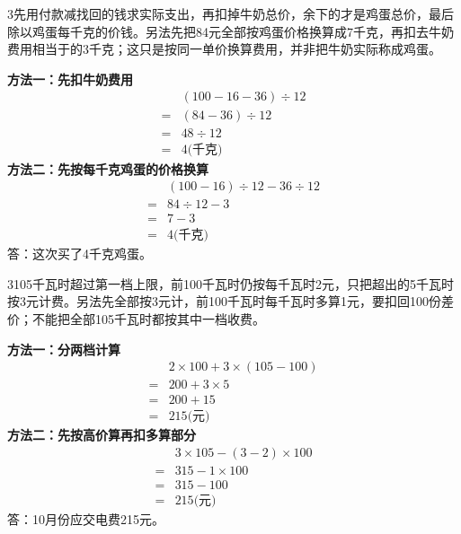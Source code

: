 \documentclass[multi=snippet,border={5bp 20bp 5bp 5bp}]{standalone}
\newenvironment{snippet}[3]{\begin{minipage}{#1bp}\color{answerred}\fontsize{#2}{#3}\selectfont\raggedright}{\end{minipage}}
\begin{document}
\begin{snippet}{505}{11.5}{14}\begin{multicols}{3}\raggedcolumns 先用付款减找回的钱求实际支出，再扣掉牛奶总价，余下的才是鸡蛋总价，最后除以鸡蛋每千克的价钱。另法先把84元全部按鸡蛋价格换算成7千克，再扣去牛奶费用相当于的3千克；这只是按同一单价换算费用，并非把牛奶实际称成鸡蛋。\par \textbf{方法一：先扣牛奶费用}\[\begin{aligned} &(100-16-36)\div12\\={}&(84-36)\div12\\={}&48\div12\\={}&4\text{(千克)}\end{aligned}\]\textbf{方法二：先按每千克鸡蛋的价格换算}\[\begin{aligned} &(100-16)\div12-36\div12\\={}&84\div12-3\\={}&7-3\\={}&4\text{(千克)}\end{aligned}\]答：这次买了4千克鸡蛋。\end{multicols}\end{snippet}
\begin{snippet}{505}{11.5}{14}\begin{multicols}{3}\raggedcolumns 105千瓦时超过第一档上限，前100千瓦时仍按每千瓦时2元，只把超出的5千瓦时按3元计费。另法先全部按3元计，前100千瓦时每千瓦时多算1元，要扣回100份差价；不能把全部105千瓦时都按其中一档收费。\par \textbf{方法一：分两档计算}\[\begin{aligned} &2\times100+3\times(105-100)\\={}&200+3\times5\\={}&200+15\\={}&215\text{(元)}\end{aligned}\]\textbf{方法二：先按高价算再扣多算部分}\[\begin{aligned} &3\times105-(3-2)\times100\\={}&315-1\times100\\={}&315-100\\={}&215\text{(元)}\end{aligned}\]答：10月份应交电费215元。\end{multicols}\end{snippet}
\end{document}
